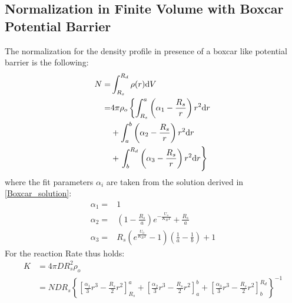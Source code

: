 \subsection{Normalization in Finite Volume with Boxcar Potential Barrier}
The normalization for the density profile in presence of a boxcar like potential barrier is the following:
\begin{align}
    N =& \int_{R_s}^{R_d} \rho(r) {\rm d} V  \\
    =& 4 \pi \rho_o \left\{ \int_{R_s} ^{a} \left( \alpha_1 - \frac{R_s}{r} \right) r^{2} {\rm d} r \right. \\
    & +  \int_{a} ^{b} \left( \alpha_2 - \frac{R_s}{r} \right) r^{2} {\rm d} r \\
    & + \left. \int_{b} ^{R_d} \left( \alpha_3 - \frac{R_s}{r} \right) r^{2} {\rm d} r\right\} \\
    \label{cp_normalization}
\end{align}
where the fit parameters $\alpha_i$ are taken from the solution derived in \eqref{Boxcar_solution}:
\begin{align}
    \alpha_1 =& 1 \\
    \alpha_2 =&  \left( 1 - \frac{R_s}{a} \right) e^{-\frac{U_o}{K_B T}} + \frac{R_s}{a} \\
    \alpha_3 =& R_s \left(e^{\frac{U_0}{K_B T}} - 1\right) \left( \frac{1}{a} - \frac{1}{b} \right) + 1
    \label{fit_parameters}
\end{align}
For the reaction Rate thus holds:
\begin{align}
    K &= 4 \pi D R_s^{2} \rho_o \\
    &= N D R_s \left\{ \left[\frac{\alpha_1}{3}r^{3} - \frac{R_s}{2}r^{2}\right]_{R_s}^{a} + \left[\frac{\alpha_2}{3}r^{3} - \frac{R_s}{2}r^{2}\right]_{a}^{b} + \left[\frac{\alpha_3}{3}r^{3} - \frac{R_s}{2}r^{2}\right]_{b}^{R_d}  \right\} ^{-1}
    \label{cp_rate}
\end{align}
